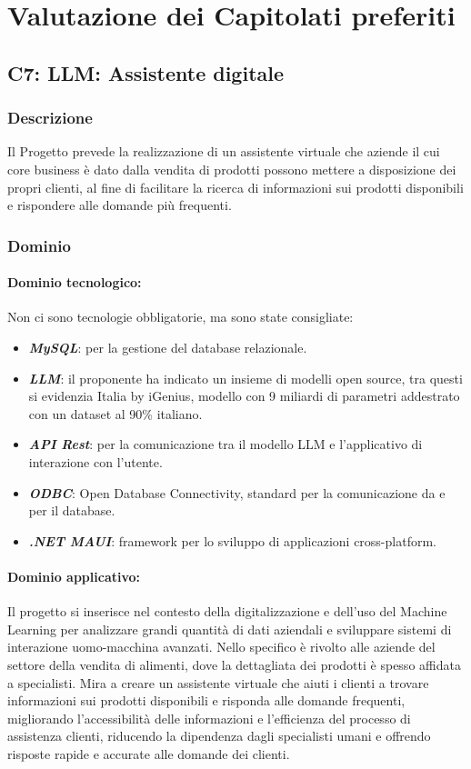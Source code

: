\section{Valutazione dei Capitolati preferiti}


\subsection{C7: LLM: Assistente digitale}

\subsubsection{Descrizione}
Il Progetto prevede la realizzazione di un assistente virtuale 
che aziende il cui core business è dato dalla vendita di prodotti
possono mettere a disposizione dei propri clienti, 
al fine di facilitare la ricerca di informazioni sui prodotti disponibili 
e rispondere alle domande più frequenti.
\subsubsection{Dominio}
\paragraph{Dominio tecnologico:}
Non ci sono tecnologie obbligatorie, ma sono state consigliate:
\begin{itemize}
    \item \textit{\textbf{MySQL}}: per la gestione del database relazionale.
    \item \textit{\textbf{LLM}}: il proponente ha indicato un insieme di modelli open source, tra questi si evidenzia Italia by iGenius, modello con 9 miliardi di parametri addestrato con un dataset al 90\% italiano.
    \item \textit{\textbf{API Rest}}: per la comunicazione tra il modello LLM e l'applicativo di interazione con l'utente.
    \item \textit{\textbf{ODBC}}: Open Database Connectivity, standard per la comunicazione da e per il database.
    \item \textit{\textbf{.NET MAUI}}: framework per lo sviluppo di applicazioni cross-platform.
\end{itemize}
\paragraph{Dominio applicativo:}
Il progetto si inserisce nel contesto della digitalizzazione e dell’uso del Machine Learning 
per analizzare grandi quantità di dati aziendali e sviluppare sistemi di interazione uomo-macchina avanzati. 
Nello specifico è rivolto alle aziende del settore della vendita di alimenti, 
dove la  dettagliata dei prodotti è spesso affidata a specialisti. 
Mira a creare un assistente virtuale che aiuti i clienti a trovare informazioni sui prodotti disponibili 
e risponda alle domande frequenti, migliorando l’accessibilità delle informazioni 
e l’efficienza del processo di assistenza clienti, riducendo la dipendenza dagli specialisti umani 
e offrendo risposte rapide e accurate alle domande dei clienti.
